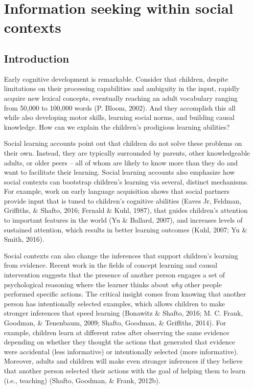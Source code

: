 \documentclass[oneside]{report}
\begin{document}
\chapter{Information seeking within social
contexts}\label{information-seeking-within-social-contexts}

\section{Introduction}\label{introduction}

Early cognitive development is remarkable. Consider that children,
despite limitations on their processing capabilities and ambiguity in
the input, rapidly acquire new lexical concepts, eventually reaching an
adult vocabulary ranging from 50,000 to 100,000 words (P. Bloom, 2002).
And they accomplish this all while also developing motor skills,
learning social norms, and building causal knowledge. How can we explain
the children's prodigious learning abilities?

Social learning accounts point out that children do not solve these
problems on their own. Instead, they are typically surrounded by
parents, other knowledgeable adults, or older peers -- all of whom are
likely to know more than they do and want to facilitate their learning.
Social learning accounts also emphasize how social contexts can
bootstrap children's learning via several, distinct mechanisms. For
example, work on early language acquisition shows that social partners
provide input that is tuned to children's cognitive abilities (Eaves Jr,
Feldman, Griffiths, \& Shafto, 2016; Fernald \& Kuhl, 1987), that guides
children's attention to important features in the world (Yu \& Ballard,
2007), and increases levels of sustained attention, which results in
better learning outcomes (Kuhl, 2007; Yu \& Smith, 2016).

Social contexts can also change the inferences that support children's
learning from evidence. Recent work in the fields of concept learning
and causal intervention suggests that the presence of another person
engages a set of psychological reasoning where the learner thinks about
\emph{why} other people performed specific actions. The critical insight
comes from knowing that another person has intentionally selected
examples, which allows children to make stronger inferences that speed
learning (Bonawitz \& Shafto, 2016; M. C. Frank, Goodman, \& Tenenbaum,
2009; Shafto, Goodman, \& Griffiths, 2014). For example, children learn
at different rates after observing the same evidence depending on
whether they thought the actions that generated that evidence were
accidental (less informative) or intentionally selected (more
informative). Moreover, adults and children will make even stronger
inferences if they believe that another person selected their actions
with the goal of helping them to learn (i.e., teaching) (Shafto,
Goodman, \& Frank, 2012b).
\end{document}
